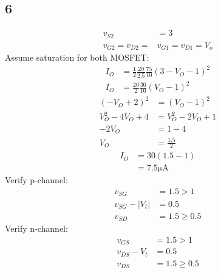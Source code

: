 \documentclass{article}
\begin{document}
\begin{multicols}{2}
    \section*{6}
    \begin{align*}
        v_{S2}            & = 3                   \\
        v_{G2} = v_{D2} = & v_{G1} = v_{D1} = V_o
    \end{align*}
    Assume saturation for both MOSFET:\@
    \begin{align*}
        I_O & = \frac{1}{2} \frac{20}{2.5} \frac{75}{10} {\left(3 - V_O - 1\right)}^2 \\
        I_O & = \frac{ 20}{2} \frac{30}{10} {\left(V_O - 1\right)}^2
    \end{align*}
    \begin{align*}
        {(-V_O + 2)}^2    & = {(V_O - 1)}^2   \\
        V_O^2 - 4 V_O + 4 & = V_O^2 -2V_O + 1 \\
        -2V_O             & = 1- 4            \\
        V_O               & = \frac{1.5}{2}
    \end{align*}
    \begin{align*}
        I_O & = 30 (1.5 - 1)           \\
            & = 7.5 \si{\micro\ampere}
    \end{align*}
    Verify p-channel:
    \begin{align*}
        v_{SG}         & = 1.5 > 1      \\
        v_{SG} - |V_t| & = 0.5          \\
        v_{SD}         & = 1.5 \geq 0.5
    \end{align*}
    Verify n-channel:
    \begin{align*}
        v_{GS}       & = 1.5 > 1      \\
        v_{DS} - V_t & = 0.5          \\
        v_{DS}       & = 1.5 \geq 0.5
    \end{align*}
\end{multicols}
\end{document}
